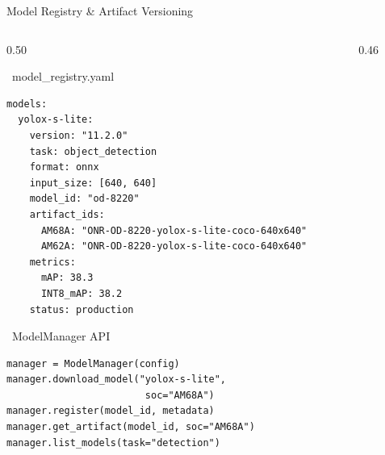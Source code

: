 \documentclass[aspectratio=169,12pt]{beamer}
\begin{document}
\begin{frame}{Model Registry \& Artifact Versioning}
  \begin{columns}[T]
    \begin{column}{0.50\textwidth}
      \begin{block}{\faArchive~model\_registry.yaml}
        \begin{lstlisting}
models:
  yolox-s-lite:
    version: "11.2.0"
    task: object_detection
    format: onnx
    input_size: [640, 640]
    model_id: "od-8220"
    artifact_ids:
      AM68A: "ONR-OD-8220-yolox-s-lite-coco-640x640"
      AM62A: "ONR-OD-8220-yolox-s-lite-coco-640x640"
    metrics:
      mAP: 38.3
      INT8_mAP: 38.2
    status: production
        \end{lstlisting}
      \end{block}
      \vspace{0.2cm}
      \begin{exampleblock}{\faPython~ModelManager API}
        \begin{lstlisting}
manager = ModelManager(config)
manager.download_model("yolox-s-lite",
                        soc="AM68A")
manager.register(model_id, metadata)
manager.get_artifact(model_id, soc="AM68A")
manager.list_models(task="detection")
        \end{lstlisting}
      \end{exampleblock}
    \end{column}

    \begin{column}{0.46\textwidth}
\end{column}
\end{columns}
\end{frame}
\end{document}
